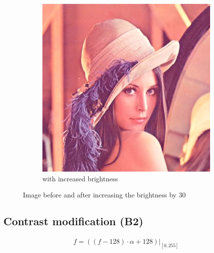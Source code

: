 \documentclass[12pt]{article}
\newcommand{\subfiguresize}{.3\textwidth}
\begin{document}
\begin{figure}[H]
\begin{subfigure}[t]{\subfiguresize}
        \includegraphics[width=\textwidth]{lenac_bright+30.png}
        \caption{with increased brightness}
    \end{subfigure}
    \caption{Image before and after increasing the brightness by 30}
\end{figure}

\subsection*{Contrast modification (B2)}

\begin{equation}
    \hat{f} = \left((f - 128) \cdot \alpha + 128\right)\Big|_{[0,255]}
\end{equation}
\end{document}
